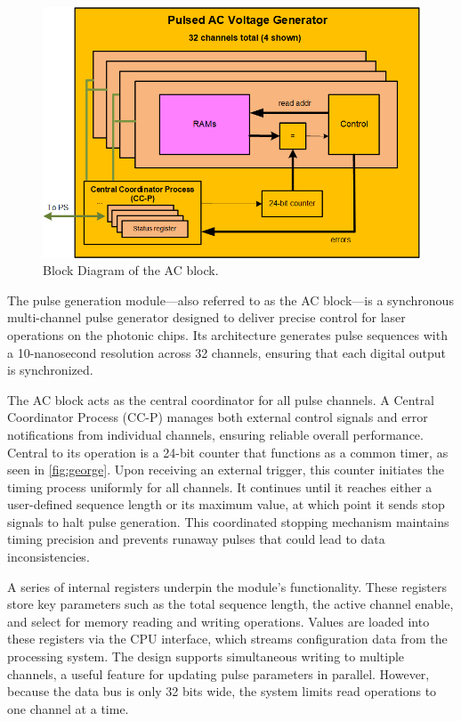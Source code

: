 \begin{figure}[ht]
    \setlength{\abovecaptionskip}{5pt}    %
    \setlength{\belowcaptionskip}{5pt}    %
    \centering
    \includegraphics[width=0.8\linewidth]{figures/5.3.png}
    \caption{Block Diagram of the AC block.}
    \label{fig:george}
\end{figure}

The pulse generation module—also referred to as the AC block—is a synchronous multi-channel pulse generator designed to deliver precise control for laser operations on the photonic chips. Its architecture generates pulse sequences with a 10-nanosecond resolution across 32 channels, ensuring that each digital output is synchronized. 

The AC block acts as the central coordinator for all pulse channels. A Central Coordinator Process (CC-P) manages both external control signals and error notifications from individual channels, ensuring reliable overall performance. Central to its operation is a 24-bit counter that functions as a common timer, as seen in \autoref{fig:george}. Upon receiving an external trigger, this counter initiates the timing process uniformly for all channels. It continues until it reaches either a user-defined sequence length or its maximum value, at which point it sends stop signals to halt pulse generation. This coordinated stopping mechanism maintains timing precision and prevents runaway pulses that could lead to data inconsistencies.

A series of internal registers underpin the module's functionality. These registers store key parameters such as the total sequence length, the active channel enable, and select for memory reading and writing operations. Values are loaded into these registers via the CPU interface, which streams configuration data from the processing system. The design supports simultaneous writing to multiple channels, a useful feature for updating pulse parameters in parallel. However, because the data bus is only 32 bits wide, the system limits read operations to one channel at a time.

